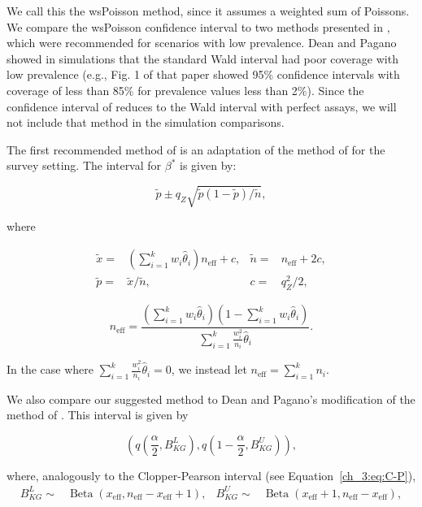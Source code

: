 We call this the wsPoisson method, since it assumes a weighted sum of Poissons.
We compare the wsPoisson confidence interval to two methods presented in \citep{Dean:2015}, which were recommended for scenarios with low prevalence.
Dean and Pagano showed in simulations that the standard Wald interval had poor coverage with low prevalence (e.g., Fig. 1 of that paper showed 95\% confidence intervals with coverage of less than 85\% for prevalence values less than 2\%).
Since the confidence interval of \citep{rosin2021estimating} reduces to the Wald interval with perfect assays, we will not include that method in the simulation comparisons.

The first recommended method of \citep{Dean:2015} is an adaptation of the method of \citep{AgrestiCoull} for the survey setting.
The interval for \( \beta^* \) is given by:

\begin{equation}
    \tilde{p} \pm q_Z \sqrt{\tilde{p}(1 - \tilde{p}) / \tilde{n}},
\end{equation}

where


\begin{align*}
   \tilde{x} =& \left( \sum_{i=1}^k w_i \hat{\theta}_i \right) n_{\text{eff}} + c, &
   \tilde{n} =& n_{\text{eff}} + 2c, \\
    \tilde{p} =& \tilde{x} / \tilde{n}, &
   c =& q_Z^2/2,
\end{align*}

\begin{equation}
   n_{\text{eff}} = \frac{\left( \sum_{i=1}^k w_i \hat{\theta}_i \right) \left(1 - \sum_{i=1}^k w_i \hat{\theta}_i \right)}{\sum_{i=1}^k \frac{w_i^2}{n_i}\hat{\theta}_i}.
   \label{ch_3:eq:neff}
\end{equation}

In the case where \( \sum_{i=1}^k \frac{w_i^2}{n_i}\hat{\theta}_i = 0 \), we instead let \( n_{\text{eff}} = \sum_{i=1}^k n_i \).

We also compare our suggested method to Dean and Pagano's modification of the method of \citep{Korn:1998,Dean:2015}.
This interval is given by

\begin{equation}
    \left( q \left( \frac{\alpha}{2}, B^L_{KG} \right), q \left( 1 - \frac{\alpha}{2}, B^U_{KG} \right) \right),
\end{equation}

where, analogously to the Clopper-Pearson interval (see Equation~\ref{ch_3:eq:C-P}),
\begin{align*}
    B^L_{KG} \sim& \operatorname{Beta}\left(x_{\text{eff}}, n_{\text{eff}} - x_{\text{eff}} + 1 \right), &
    B^U_{KG} \sim& \operatorname{Beta}\left(x_{\text{eff}} + 1, n_{\text{eff}} - x_{\text{eff}} \right),
\end{align*}

